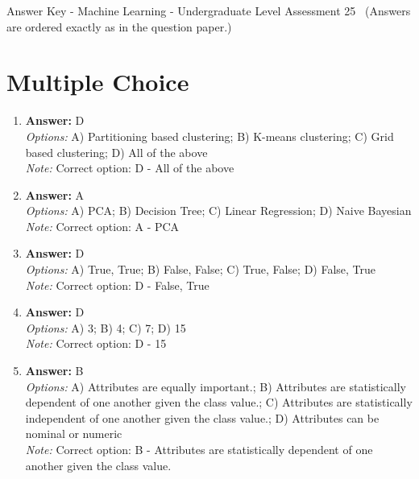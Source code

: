 \documentclass[12pt]{article}
\begin{document}
\begin{center}
Answer Key - Machine Learning - Undergraduate Level Assessment 25 \
\small (Answers are ordered exactly as in the question paper.)
\end{center}

\section*{Multiple Choice}
\begin{enumerate}[label=\arabic*.]
\item \textbf{Answer:} D
\\ \textit{Options:} A) Partitioning based clustering; B) K-means clustering; C) Grid based clustering; D) All of the above
\\ \textit{Note:} Correct option: D - All of the above
\item \textbf{Answer:} A
\\ \textit{Options:} A) PCA; B) Decision Tree; C) Linear Regression; D) Naive Bayesian
\\ \textit{Note:} Correct option: A - PCA
\item \textbf{Answer:} D
\\ \textit{Options:} A) True, True; B) False, False; C) True, False; D) False, True
\\ \textit{Note:} Correct option: D - False, True
\item \textbf{Answer:} D
\\ \textit{Options:} A) 3; B) 4; C) 7; D) 15
\\ \textit{Note:} Correct option: D - 15
\item \textbf{Answer:} B
\\ \textit{Options:} A) Attributes are equally important.; B) Attributes are statistically dependent of one another given the class value.; C) Attributes are statistically independent of one another given the class value.; D) Attributes can be nominal or numeric
\\ \textit{Note:} Correct option: B - Attributes are statistically dependent of one another given the class value.
\end{enumerate}
\end{document}
